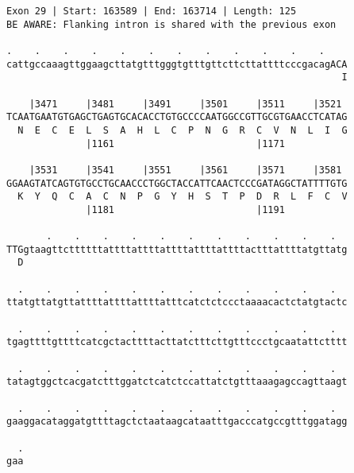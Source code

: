 \documentclass{article}
\begin{document}
\begin{Verbatim}
Exon 29 | Start: 163589 | End: 163714 | Length: 125
BE AWARE: Flanking intron is shared with the previous exon
 
.    .    .    .    .    .    .    .    .    .    .    .    
cattgccaaagttggaagcttatgtttgggtgtttgttcttcttattttcccgacagACA
                                                           I
  
    |3471     |3481     |3491     |3501     |3511     |3521 
TCAATGAATGTGAGCTGAGTGCACACCTGTGCCCCAATGGCCGTTGCGTGAACCTCATAG
  N  E  C  E  L  S  A  H  L  C  P  N  G  R  C  V  N  L  I  G
              |1161                         |1171           
  
    |3531     |3541     |3551     |3561     |3571     |3581 
GGAAGTATCAGTGTGCCTGCAACCCTGGCTACCATTCAACTCCCGATAGGCTATTTTGTG
  K  Y  Q  C  A  C  N  P  G  Y  H  S  T  P  D  R  L  F  C  V
              |1181                         |1191           
  
       .    .    .    .    .    .    .    .    .    .    .  
TTGgtaagttcttttttattttattttattttattttattttactttattttatgttatg
  D                                                         
  
  .    .    .    .    .    .    .    .    .    .    .    .  
ttatgttatgttattttattttattttatttcatctctccctaaaacactctatgtactc
  
  .    .    .    .    .    .    .    .    .    .    .    .  
tgagttttgttttcatcgctacttttacttatctttcttgtttccctgcaatattctttt
  
  .    .    .    .    .    .    .    .    .    .    .    .  
tatagtggctcacgatctttggatctcatctccattatctgtttaaagagccagttaagt
  
  .    .    .    .    .    .    .    .    .    .    .    .  
gaaggacataggatgttttagctctaataagcataatttgacccatgccgtttggatagg
  
  .
gaa
\end{Verbatim}
\newpage
\end{document}
